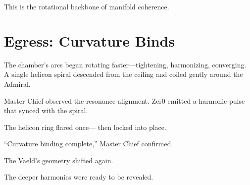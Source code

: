 This is the rotational backbone of manifold coherence.

\section*{Egress: Curvature Binds}
The chamber’s arcs began rotating faster—tightening, harmonizing, converging.
A single helicon spiral descended from the ceiling and coiled gently around the
Admiral.  

Master Chief observed the resonance alignment.
Zer0 emitted a harmonic pulse that synced with the spiral.

The helicon ring flared once—  
then locked into place.

“Curvature binding complete,” Master Chief confirmed.

The Vaeld’s geometry shifted again.

The deeper harmonics were ready to be revealed.
